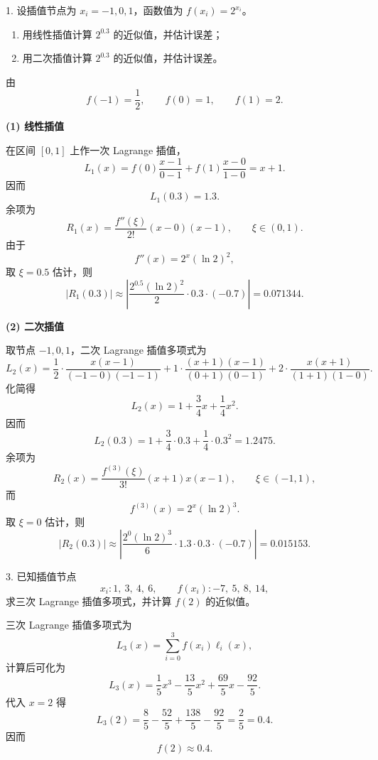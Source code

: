 \documentclass[11pt, a4paper]{ctexart}
\begin{document}
\begin{problem}{1. 设插值节点为 $x_i=-1,0,1$，函数值为 $f(x_i)=2^{x_i}$。}
    \begin{enumerate}[(1)]
        \item 用线性插值计算 $2^{0.3}$ 的近似值，并估计误差；
        \item 用二次插值计算 $2^{0.3}$ 的近似值，并估计误差。
    \end{enumerate}
\end{problem}

\begin{solution}
    由
    \[
        f(-1)=\frac{1}{2},\qquad f(0)=1,\qquad f(1)=2.
    \]

    \textbf{(1) 线性插值}

    在区间 $[0,1]$ 上作一次 Lagrange 插值，
    \[
        L_1(x)=f(0)\frac{x-1}{0-1}+f(1)\frac{x-0}{1-0}=x+1.
    \]
    因而
    \[
        L_1(0.3)=1.3.
    \]
    余项为
    \[
        R_1(x)=\frac{f''(\xi)}{2!}(x-0)(x-1),\qquad \xi\in(0,1).
    \]
    由于
    \[
        f''(x)=2^x(\ln 2)^2,
    \]
    取 $\xi=0.5$ 估计，则
    \[
        |R_1(0.3)|\approx \left|\frac{2^{0.5}(\ln 2)^2}{2}\cdot 0.3\cdot(-0.7)\right|
        =0.071344.
    \]

    \textbf{(2) 二次插值}

    取节点 $-1,0,1$，二次 Lagrange 插值多项式为
    \[
        L_2(x)=\frac{1}{2}\cdot\frac{x(x-1)}{(-1-0)(-1-1)}
        +1\cdot\frac{(x+1)(x-1)}{(0+1)(0-1)}
        +2\cdot\frac{x(x+1)}{(1+1)(1-0)}.
    \]
    化简得
    \[
        L_2(x)=1+\frac{3}{4}x+\frac{1}{4}x^2.
    \]
    因而
    \[
        L_2(0.3)=1+\frac{3}{4}\cdot 0.3+\frac{1}{4}\cdot 0.3^2=1.2475.
    \]
    余项为
    \[
        R_2(x)=\frac{f^{(3)}(\xi)}{3!}(x+1)x(x-1),\qquad \xi\in(-1,1),
    \]
    而
    \[
        f^{(3)}(x)=2^x(\ln 2)^3.
    \]
    取 $\xi=0$ 估计，则
    \[
        |R_2(0.3)|\approx \left|\frac{2^0(\ln 2)^3}{6}\cdot 1.3\cdot 0.3\cdot(-0.7)\right|
        =0.015153.
    \]
\end{solution}


\begin{problem}{3. 已知插值节点}
    \[
        x_i: 1,\ 3,\ 4,\ 6,\qquad f(x_i): -7,\ 5,\ 8,\ 14,
    \]
    求三次 Lagrange 插值多项式，并计算 $f(2)$ 的近似值。
\end{problem}

\begin{solution}
    三次 Lagrange 插值多项式为
    \[
        L_3(x)=\sum_{i=0}^{3} f(x_i)\ell_i(x),
    \]
    计算后可化为
    \[
        L_3(x)=\frac{1}{5}x^3-\frac{13}{5}x^2+\frac{69}{5}x-\frac{92}{5}.
    \]
    代入 $x=2$ 得
    \[
        L_3(2)=\frac{8}{5}-\frac{52}{5}+\frac{138}{5}-\frac{92}{5}=\frac{2}{5}=0.4.
    \]
    因而
    \[
        f(2)\approx 0.4.
    \]
\end{solution}
\end{document}
